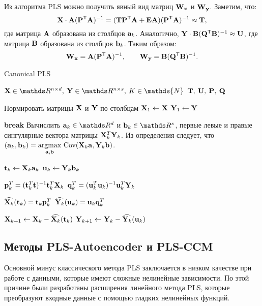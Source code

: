 \documentclass[a4paper, 12pt]{article}
\begin{document}
Из алгоритма PLS можно получить явный вид матриц $\mathbf{W}_{\mathbf{x}}$ и $\mathbf{W}_{\mathbf{y}}$. Заметим, что:
$$ \mathbf{X} \cdot \mathbf{A}(\mathbf{P} ^{\mathsf{T}} \mathbf{A})^{-1} = (\mathbf{T} \mathbf{P} ^{\mathsf{T}} \mathbf{A} + \mathbf{E} \mathbf{A})(\mathbf{P} ^{\mathsf{T}} \mathbf{A})^{-1} \approx \mathbf{T}, $$
где матрица $\mathbf{A}$ образована из столбцов $\mathbf{a}_k$. Аналогично, $\mathbf{Y} \cdot \mathbf{B}(\mathbf{Q} ^{\mathsf{T}} \mathbf{B})^{-1} \approx \mathbf{U}$, где матрица $\mathbf{B}$ образована из столбцов $\mathbf{b}_k$. 
Таким образом:
$$ \mathbf{W}_{\mathbf{x}} = \mathbf{A}(\mathbf{P} ^{\mathsf{T}} \mathbf{A})^{-1}, \qquad \mathbf{W}_{\mathbf{y}} = \mathbf{B}(\mathbf{Q} ^{\mathsf{T}} \mathbf{B})^{-1}. $$

\begin{algorithm}[bhtp]
	\caption{Canonical PLS}\label{alg:pls}
	\begin{algorithmic}
		\Require $\bX \in \dR^{n \times d}, \: \bY \in \dR^{n \times s}, \: K \in \mathds{N}$
		\Ensure $\mathbf{T}, \: \mathbf{U}, \: \mathbf{P}, \: \mathbf{Q}$
		
		\State Нормировать матрицы $\mathbf{X}$ и $\mathbf{Y}$ по столбцам
		\State $\mathbf{X}_1 \gets \mathbf{X}$
		\State $\mathbf{Y}_1 \gets \mathbf{Y}$

				\State \textbf{break}
			\EndIf
			\State Вычислить $\ba_k \in \dR^d$ и $\bb_k \in \dR^s$, первые
			\State левые и правые сингулярные вектора матрицы $\mathbf{X}_k^T \mathbf{Y}_k$.
			\State Из определения следует, что $(\mathbf{a}_k, \mathbf{b}_k) = \underset{\mathbf{a}, \mathbf{b}}{\text{argmax}} \text{ Cov} (\mathbf{X}_k \mathbf{a}, \mathbf{Y}_k \mathbf{b})$.
			
			\State $\mathbf{t}_k \gets \mathbf{X}_k \mathbf{a}_k$
			\State $\mathbf{u}_k \gets \mathbf{Y}_k \mathbf{b}_k$
			
			\State $\mathbf{p}_k^T = (\mathbf{t}_k^T \mathbf{t})^{-1} \mathbf{t}_k^T \mathbf{X}_k$
			\State $\mathbf{q}_k^T = (\mathbf{u}_k^T \mathbf{u}_k)^{-1} \mathbf{u}_k^T \mathbf{Y}_k$
			
			\State $\widehat{\mathbf{X}_k}(\mathbf{t}_k) = \mathbf{t}_k \mathbf{p}_k^T$
			\State $\widehat{\mathbf{Y}_k}(\mathbf{u}_k) = \mathbf{u}_k \mathbf{q}_k^T$
			
			\State $\mathbf{X}_{k+1} \gets \mathbf{X}_k - \widehat{\mathbf{X}_k}(\mathbf{t}_k)$
			\State $\mathbf{Y}_{k+1} \gets \mathbf{Y}_k - \widehat{\mathbf{Y}_k}(\mathbf{u}_k)$
		\EndFor
	\end{algorithmic}
\end{algorithm}

\subsection{Методы PLS-Autoencoder и PLS-CCM}
Основной минус классического метода PLS заключается в низком качестве при работе с данными, которые имеют сложные нелинейные зависимости. 
По этой причине были разработаны расширения линейного метода PLS, которые преобразуют входные данные с помощью гладких нелинейных функций.
 
\end{document}
